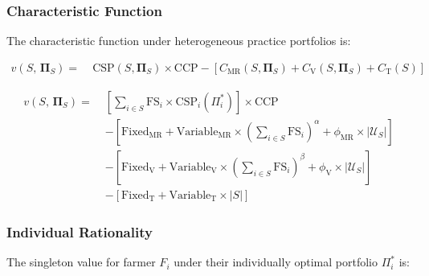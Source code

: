 \documentclass[manuscript, screen]{acmart}
\begin{document}
\subsubsection*{Characteristic Function}

The characteristic function under heterogeneous practice portfolios is:

\begin{equation}
\begin{split}
v(S,\, \boldsymbol{\Pi}_S) = \;
    & \text{CSP}(S, \boldsymbol{\Pi}_S) \times \text{CCP} - [ C_{\text{MR}}(S, \boldsymbol{\Pi}_S) + C_{\text{V}}(S, \boldsymbol{\Pi}_S) + C_{\text{T}}(S)]
\end{split}
\end{equation}


\begin{equation}
\begin{split}
v(S,\, \boldsymbol{\Pi}_S) = \;
    & \left[\sum_{i \in S} \text{FS}_i \times \text{CSP}_i(\Pi_i^*)\right] \times \text{CCP} \\
    & - \left[\text{Fixed}_{\text{MR}} + \text{Variable}_{\text{MR}}
        \times \left(\sum_{i \in S} \text{FS}_i\right)^{\!\alpha}
        + \phi_{\text{MR}} \times |\mathcal{U}_S|\right] \\
    & - \left[\text{Fixed}_{\text{V}} + \text{Variable}_{\text{V}}
        \times \left(\sum_{i \in S} \text{FS}_i\right)^{\!\beta}
        + \phi_{\text{V}} \times |\mathcal{U}_S|\right] \\
    & - \left[\text{Fixed}_{\text{T}} + \text{Variable}_{\text{T}} \times |S|\right]
\end{split}
\end{equation}


\subsubsection*{Individual Rationality}

The singleton value for farmer $F_i$ under their individually optimal portfolio
$\Pi_i^*$ is:
\end{document}
